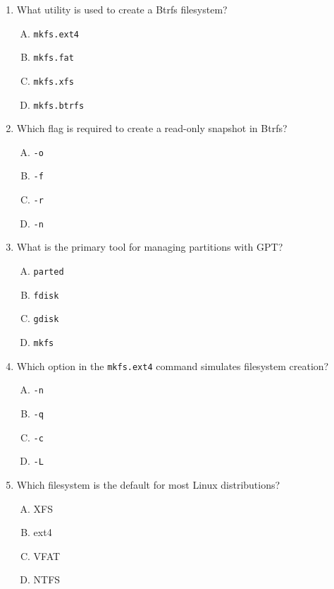 \documentclass[a4paper]{report}
\begin{document}
\begin{enumerate}[1.]
    \item What utility is used to create a Btrfs filesystem?  
    \begin{enumerate}[A)]
        \item \texttt{mkfs.ext4}  
        \item \texttt{mkfs.fat}  
        \item \texttt{mkfs.xfs}  
        \item \texttt{mkfs.btrfs}  
    \end{enumerate}

    \item Which flag is required to create a read-only snapshot in Btrfs?  
    \begin{enumerate}[A)]
        \item \texttt{-o}  
        \item \texttt{-f}  
        \item \texttt{-r}  
        \item \texttt{-n}  
    \end{enumerate}

    \item What is the primary tool for managing partitions with GPT?  
    \begin{enumerate}[A)]
        \item \texttt{parted}  
        \item \texttt{fdisk}  
        \item \texttt{gdisk}  
        \item \texttt{mkfs}  
    \end{enumerate}

    \item Which option in the \texttt{mkfs.ext4} command simulates filesystem creation?  
    \begin{enumerate}[A)]
        \item \texttt{-n}  
        \item \texttt{-q}  
        \item \texttt{-c}  
        \item \texttt{-L}  
    \end{enumerate}

    \item Which filesystem is the default for most Linux distributions?  
    \begin{enumerate}[A)]
        \item XFS  
        \item ext4  
        \item VFAT  
        \item NTFS  
    \end{enumerate}


\end{enumerate}
\end{document}
